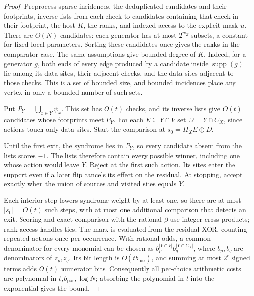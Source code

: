 \documentclass[10pt,twocolumn]{article}
\theoremstyle{definition}
\DeclareMathOperator{\supp}{supp}
\newcommand{\bpar}{b_{\mathrm{par}}}
\begin{document}
\begin{proof}
Preprocess sparse incidences, the deduplicated candidates and their
footprints, inverse lists from each check to candidates containing that
check in their footprint, the host $K$, the ranks, and indexed access
to the explicit mask $u$. There are $O(N)$ candidates: each generator
has at most $2^{w_Z}$ subsets, a constant for fixed local parameters.
Sorting these candidates once gives the ranks in the comparator case.
The same assumptions give bounded degree of $K$. Indeed, for a
generator $g$, both ends of every edge produced by a candidate inside
$\supp(g)$ lie among its data sites, their adjacent checks, and the
data sites adjacent to those checks. This is a set of bounded size,
and bounded incidences place any vertex in only a bounded number of
such sets.

Put $P_Y=\bigcup_{x\in Y}\psi_x$. This set has $O(t)$ checks, and its
inverse lists give $O(t)$ candidates whose footprints meet $P_Y$.
For each $E\subseteq Y\cap V$ set $D=Y\cap C_X$, since actions touch
only data sites. Start the comparison at $s_0=H_XE\oplus D$.

Until the first exit, the syndrome lies in $P_Y$, so every candidate
absent from the lists scores $-1$. The lists therefore contain every
possible winner, including one whose action would leave $Y$. Reject
at the first such action. Its sites enter the support even if a later
flip cancels its effect on the residual. At stopping, accept exactly
when the union of sources and visited sites equals $Y$.

Each interior step lowers syndrome weight by at least one, so there are
at most $|s_0|=O(t)$ such steps, with at most one additional comparison
that detects an exit. Scoring and exact comparison with the rational
$\beta$ use integer cross-products; rank access handles ties. The mark
is evaluated from the residual XOR, counting repeated actions once per
occurrence. With rational odds, a common denominator for every monomial
can be chosen as $b_p^{|Y\cap V|}b_q^{|Y\cap C_X|}$, where $b_p,b_q$
are denominators of $z_p,z_q$. Its bit length is $O(t\bpar)$, and summing
at most $2^t$ signed terms adds $O(t)$ numerator bits. Consequently all
per-choice arithmetic costs are polynomial in $t,\bpar,\log N$;
absorbing the polynomial in $t$ into the exponential gives the bound.
\end{proof}
\end{document}
